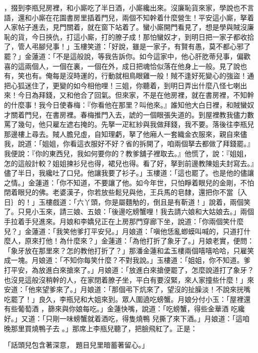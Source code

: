 \begin{showcontents}{}
，掇到李瓶兒房裡，和小廝吃了半日酒，小廝纔出來。沒廉恥貨來家，學說也不言語，還和小廝在花園書房里插着門兒，兩個不知幹着什麼營生！平安這小廝，拏着人家帖子進去，見門關着，就在窗下站着了。蠻小廝開門看見了，想是學與賊沒廉恥的貨，今日挾仇，打這小廝，打的膫子成！那怕蠻奴才，到明日把一家子都收拾了，管人弔腳兒事！」玉樓笑道：「好說，雖是一家子，有賢有愚，莫不都心邪了罷？」金蓮道：「不是這般說，等我告訴你。如今這家中，他心肝肐蒂兒事，偏歡喜的這兩個人，一個在裏，一個在外，成日把魂恰似落在他身上一般。見了說也有，笑也有。俺每是沒時運的，行動就相鳥眼雞一般！賊不逢好死變心的強盜！通把心狐迷住了，更變的如今相他哩！三姐，你聽着，到明日弄出什麼八怪七喇出來！今日為拜錢，又和他合了回氣。但來家，不是在他房裡，就在書房裡，不知幹的什麼事！我今日使春梅：『你看他在那里？叫他來。』誰知他大白日裡，和賊蠻奴才關着門兒，在書房裡。春梅推門入去，諕的一個眼張失道的。到屋裡教我儘力數罵了幾句，他只雇左遮右掩的。先拏一疋紅紗與我做拜錢，我不要。落後往李瓶兒那邊樓上尋去。賊人膽兒虛，自知理虧，拏了他廂人一套織金衣服來，親自來儘我，說道：「姐姐，你看這衣服好不好？省的拆開了，咱兩個拏去都做了拜錢罷。』我便說：『你的東西兒，我如何要你的？教爹舖子裡取去。』他慌了，說：『姐姐，怎的這般計較？姐姐揀衫兒也得，裙兒也得。看了好，拏到前邊教陳姐夫封寫去。』儘了半日，我纔吐了口兒。他讓我要了衫子。」玉樓道：「這也罷了。也是他的儘讓之情。」金蓮道：「你不知道，不要讓了他。如今年世，只怕睜着眼兒的金剛，不怕閉着眼兒的佛。老婆漢子，你若放些鬆兒與他，王兵馬的皂隸，還把你不當｛入日｝的！」玉樓戲道：「六丫頭，你是屬麵觔的，倒且是有靳道！」說着，兩個笑了。只見小玉來，請三娘、五娘：「後邊吃螃蟹哩！我去請六娘和大姑娘去。」兩個手拉着手兒進來。月娘和李嬌兒正在上房那門穿廊下坐，說道：「你兩個笑什麼兒？」金蓮道：「我笑他爹打平安兒。」月娘道：「嗔他恁亂蝍蟆叫喊的，只道打什麼人，原來打他！為什麼來？」金蓮道：「為他打折了象牙了。」月娘老實，便問：「象牙放在那里來？怎的教他打折了？」那潘金蓮和孟玉樓兩個嘻嘻哈哈，只雇笑成一塊。月娘道：「不知你每笑什麼？不對我說。」玉樓道：「姐姐，你不知道。爹打平安，為放進白來搶來了。」月娘道：「放進白來搶便罷了，怎麼說道打了象牙？也沒見這般沒稍幹的人，在家閉着膫子坐，平白有要沒緊，來人家撞些什麼！」來安道：「他來望爹來了。」月娘道：「那個弔下炕來了，望沒的扯臊淡！不說來挄嘴吃罷了！」良久，李瓶兒和大姐來到。眾人圍遶吃螃蟹。月娘分付小玉：「屋裡還有些葡萄酒 ，篩來與你娘每吃。」金蓮快嘴，說道：「吃螃蟹，得些金華酒 吃纔好。」又道：「只剛一味螃蟹就着酒吃，得隻燒鴨 兒撕了來下酒。」月娘道：「這咱晚那里買燒鴨子去 。」那席上李瓶兒聽了，把臉飛紅了。正是：

「話頭兒包含著深意，  題目兒里暗蓄著留心。」


\end{showcontents}
